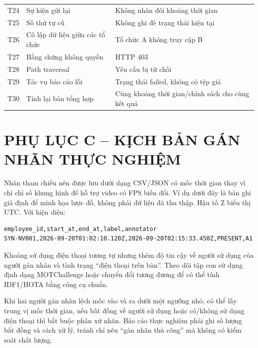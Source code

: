 \begin{longtable}{p{1.1cm}p{4.6cm}p{7.5cm}}
T24 & Sự kiện gửi lại & Không nhân đôi khoảng thời gian\\
T25 & Số thứ tự cũ & Không ghi đè trạng thái hiện tại\\
T26 & Cô lập dữ liệu giữa các tổ chức & Tổ chức A không truy cập B\\
T27 & Bằng chứng không quyền & HTTP 403\\
T28 & Path traversal & Yêu cầu bị từ chối\\
T29 & Tác vụ báo cáo lỗi & Trạng thái failed, không có tệp giả\\
T30 & Tính lại bản tổng hợp & Cùng khoảng thời gian/chính sách cho cùng kết quả\\
\bottomrule
\end{longtable}

\clearpage
\section*{PHỤ LỤC C -- KỊCH BẢN GÁN NHÃN THỰC NGHIỆM}
Nhãn tham chiếu nên được lưu dưới dạng CSV/JSON có mốc thời gian thay vì chỉ chỉ số khung hình để hỗ trợ video có FPS biến đổi. Ví dụ dưới đây là bản ghi giả định để minh họa lược đồ, không phải dữ liệu đã thu thập. Hậu tố Z biểu thị UTC. Với hiện diện:
\begin{Verbatim}[fontsize=\small,breaklines=true,breakanywhere=true]
employee_id,start_at,end_at,label,annotator
SYN-NV001,2026-09-20T01:02:10.120Z,2026-09-20T02:15:33.450Z,PRESENT,A1
\end{Verbatim}
Khoảng sử dụng điện thoại tương tự nhưng thêm độ tin cậy về người sử dụng của người gán nhãn và tình trạng ``điện thoại trên bàn''. Theo dõi tập con sử dụng định dạng MOTChallenge hoặc chuyển đổi tương đương để có thể tính IDF1/HOTA bằng công cụ chuẩn.

Khi hai người gán nhãn lệch mốc vào và ra dưới một ngưỡng nhỏ, có thể lấy trung vị mốc thời gian, nếu bất đồng về người sử dụng hoặc có/không sử dụng điện thoại thì bắt buộc phân xử nhãn. Báo cáo thực nghiệm phải ghi số lượng bất đồng và cách xử lý, tránh chỉ nêu ``gán nhãn thủ công'' mà không có kiểm soát chất lượng.

\clearpage

